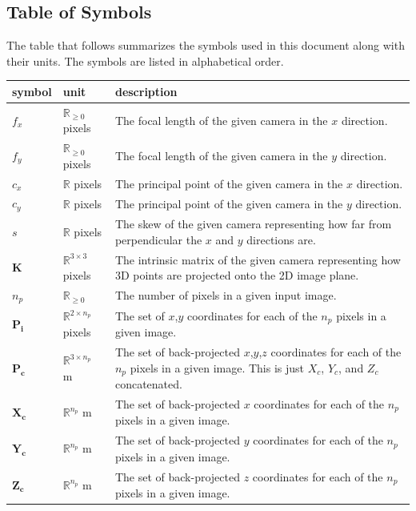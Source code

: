 \documentclass[12pt]{article}
\begin{document}
\subsection{Table of Symbols}

The table that follows summarizes the symbols used in this document along with
their units. The symbols are listed in alphabetical order.

\renewcommand{\arraystretch}{1.2}
\noindent \begin{longtable*}{l l p{12cm}} \toprule
\textbf{symbol} & \textbf{unit} & \textbf{description}\\
\midrule 
$f_x$ & $\mathbb{R}_{\geq0}$ pixels & The focal length of the given camera in the $x$ direction.
\\
$f_y$ & $\mathbb{R}_{\geq0}$ pixels & The focal length of the given camera in the $y$ direction.
\\
$c_x$ & $\mathbb{R}$ pixels & The principal point of the given camera in the $x$ direction.
\\
$c_y$ & $\mathbb{R}$ pixels & The principal point of the given camera in the $y$ direction.
\\
$s$ & $\mathbb{R}$ pixels & The skew of the given camera representing how far from perpendicular the $x$ and $y$ directions are.
\\
$\mathbf{K}$ & $\mathbb{R}^{3\times3}$ pixels & The intrinsic matrix of the given camera representing how 3D points are projected onto the 2D image plane.
\\
$n_p$ & $\mathbb{R}_{\geq0}$ & The number of pixels in a given input image.
\\
$\mathbf{P_i}$ & $\mathbb{R}^{2\times{}n_p}$ pixels & The set of $x$,$y$ coordinates for each of the $n_p$ pixels in a given image.
\\
$\mathbf{P_c}$ & $\mathbb{R}^{3\times{}n_p}$ m & The set of back-projected $x$,$y$,$z$ coordinates for each of the $n_p$ pixels in a given image. This is just $X_{c}$, $Y_{c}$, and $Z_{c}$ concatenated.
\\
$\mathbf{X_c}$ & $\mathbb{R}^{n_p}$ m & The set of back-projected $x$ coordinates for each of the $n_p$ pixels in a given image.
\\
$\mathbf{Y_c}$ & $\mathbb{R}^{n_p}$ m & The set of back-projected $y$ coordinates for each of the $n_p$ pixels in a given image.
\\
$\mathbf{Z_c}$ & $\mathbb{R}^{n_p}$ m & The set of back-projected $z$ coordinates for each of the $n_p$ pixels in a given image.

\end{longtable*}
\end{document}
